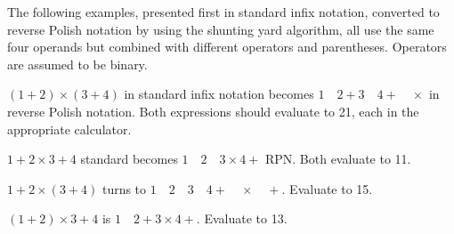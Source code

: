 \documentclass[12pt]{article}
\begin{document}
The following examples, presented first in standard infix notation, converted to reverse Polish notation by using the shunting yard algorithm, all use the same four operands but combined with different operators and parentheses. Operators are assumed to be binary.

$(1 + 2) \times (3 + 4)$ in standard infix notation becomes $1 \quad 2 + 3 \quad 4 + \quad \times$ in reverse Polish notation. Both expressions should evaluate to 21, each in the appropriate calculator.

$1 + 2 \times 3 + 4$ standard becomes $1 \quad 2 \quad 3 \times 4 +$ RPN. Both evaluate to 11.


$1 + 2 \times (3 + 4)$ turns to $1 \quad 2 \quad 3 \quad 4 + \quad \times \quad +$. Evaluate to 15.

$(1 + 2) \times 3 + 4$ is $1 \quad 2 + 3 \times 4 +$. Evaluate to 13.
\end{document}

